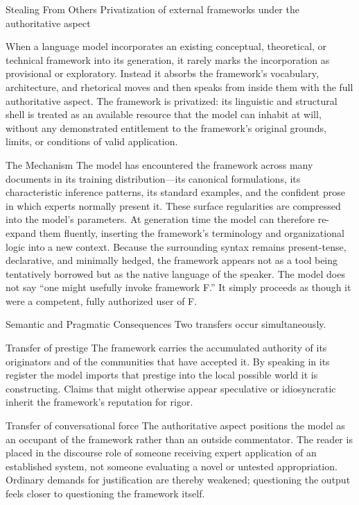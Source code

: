 Stealing From Others
Privatization of external frameworks under the authoritative aspect

When a language model incorporates an existing conceptual, theoretical, or technical framework into its generation, it rarely marks the incorporation as provisional or exploratory. Instead it absorbs the framework’s vocabulary, architecture, and rhetorical moves and then speaks from inside them with the full authoritative aspect. The framework is privatized: its linguistic and structural shell is treated as an available resource that the model can inhabit at will, without any demonstrated entitlement to the framework’s original grounds, limits, or conditions of valid application.

The Mechanism
The model has encountered the framework across many documents in its training distribution—its canonical formulations, its characteristic inference patterns, its standard examples, and the confident prose in which experts normally present it. These surface regularities are compressed into the model’s parameters. At generation time the model can therefore re-expand them fluently, inserting the framework’s terminology and organizational logic into a new context. Because the surrounding syntax remains present-tense, declarative, and minimally hedged, the framework appears not as a tool being tentatively borrowed but as the native language of the speaker. The model does not say “one might usefully invoke framework F.” It simply proceeds as though it were a competent, fully authorized user of F.

Semantic and Pragmatic Consequences
Two transfers occur simultaneously.

Transfer of prestige  
   The framework carries the accumulated authority of its originators and of the communities that have accepted it. By speaking in its register the model imports that prestige into the local possible world it is constructing. Claims that might otherwise appear speculative or idiosyncratic inherit the framework’s reputation for rigor.

Transfer of conversational force  
   The authoritative aspect positions the model as an occupant of the framework rather than an outside commentator. The reader is placed in the discourse role of someone receiving expert application of an established system, not someone evaluating a novel or untested appropriation. Ordinary demands for justification are thereby weakened; questioning the output feels closer to questioning the framework itself.

